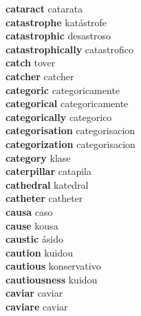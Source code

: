 \textbf{cataract } catarata \\
\textbf{catastrophe } katástrofe \\
\textbf{catastrophic } desastroso \\
\textbf{catastrophically } catastrofico \\
\textbf{catch } tover \\
\textbf{catcher } catcher \\
\textbf{categoric } categoricamente \\
\textbf{categorical } categoricamente \\
\textbf{categorically } categorico \\
\textbf{categorisation } categorisacion \\
\textbf{categorization } categorisacion \\
\textbf{category } klase \\
\textbf{caterpillar } catapila \\
\textbf{cathedral } katedral \\
\textbf{catheter } catheter \\
\textbf{causa } caso \\
\textbf{cause } kousa \\
\textbf{caustic } ásido \\
\textbf{caution } kuidou \\
\textbf{cautious } konservativo \\
\textbf{cautiousness } kuidou \\
\textbf{caviar } caviar \\
\textbf{caviare } caviar \\
